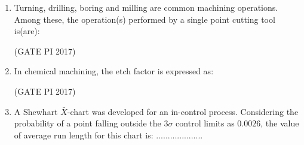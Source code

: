 \documentclass[journal,12pt,onecolumn]{IEEEtran}
\theoremstyle{remark}
\begin{document}
\begin{enumerate}
(P) support and transfer the stresses to the fibers  

(Q) reduce propagation of cracks  

(R) carry the entire load  

(S) protect the fibers against damage  

The correct statements are:
\begin{enumerate}
\end{enumerate}
\hfill (GATE PI 2017)

\item Turning, drilling, boring and milling are common machining operations. Among these, the operation(s) performed by a single point cutting tool is(are):
\begin{enumerate}
\end{enumerate}
\hfill (GATE PI 2017)

\newpage
\item In chemical machining, the etch factor is expressed as:
\begin{enumerate}
\end{enumerate}
\hfill (GATE PI 2017)
\newline
\item A Shewhart $\bar{X}$-chart was developed for an in-control process. Considering the probability of a point falling outside the $3\sigma$ control limits as $0.0026$, the value of average run length for this chart is:  
....................   


\end{enumerate}
\end{document}
